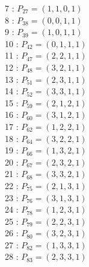 \documentclass{article}
\begin{document}
{\begin{multicols}{3}
7 : $P_{27}=( 1, 1, 0, 1 )$\\
8 : $P_{38}=( 0, 0, 1, 1 )$\\
9 : $P_{39}=( 1, 0, 1, 1 )$\\
10 : $P_{42}=( 0, 1, 1, 1 )$\\
11 : $P_{47}=( 2, 2, 1, 1 )$\\
12 : $P_{48}=( 3, 2, 1, 1 )$\\
13 : $P_{51}=( 2, 3, 1, 1 )$\\
14 : $P_{52}=( 3, 3, 1, 1 )$\\
15 : $P_{59}=( 2, 1, 2, 1 )$\\
16 : $P_{60}=( 3, 1, 2, 1 )$\\
17 : $P_{62}=( 1, 2, 2, 1 )$\\
18 : $P_{64}=( 3, 2, 2, 1 )$\\
19 : $P_{66}=( 1, 3, 2, 1 )$\\
20 : $P_{67}=( 2, 3, 2, 1 )$\\
21 : $P_{68}=( 3, 3, 2, 1 )$\\
22 : $P_{75}=( 2, 1, 3, 1 )$\\
23 : $P_{76}=( 3, 1, 3, 1 )$\\
24 : $P_{78}=( 1, 2, 3, 1 )$\\
25 : $P_{79}=( 2, 2, 3, 1 )$\\
26 : $P_{80}=( 3, 2, 3, 1 )$\\
27 : $P_{82}=( 1, 3, 3, 1 )$\\
28 : $P_{83}=( 2, 3, 3, 1 )$\\
\end{multicols}


%


%


}%
\end{document}
